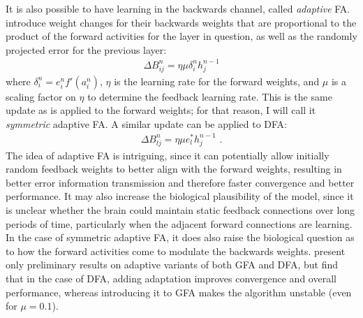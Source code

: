It is also possible to have learning in the backwards channel,
called \emph{adaptive} FA.
\textcite{Baldi2016} introduce weight changes for their backwards weights
that are proportional to the product of the forward activities
for the layer in question,
as well as the randomly projected error for the previous layer:
\begin{align}
  \Delta B^n_{ij} = \eta\mu \delta^n_i h^{n-1}_j
\end{align}
where $\delta^n_i = e^n_i f'(a^n_i)$,
$\eta$ is the learning rate for the forward weights,
and $\mu$ is a scaling factor on $\eta$ to determine the feedback learning rate.
This is the same update as is applied to the forward weights;
for that reason, I will call it \emph{symmetric} adaptive FA.
A similar update can be applied to DFA:
\begin{align}
  \Delta B^n_{lj} = \eta\mu e^*_l h^{n-1}_j \text{ .}
\end{align}
The idea of adaptive FA is intriguing,
since it can potentially allow initially random feedback weights
to better align with the forward weights,
resulting in better error information transmission
and therefore faster convergence and better performance.
It may also increase the biological plausibility of the model,
since it is unclear whether the brain could maintain static feedback connections
over long periods of time,
particularly when the adjacent forward connections are learning.
In the case of symmetric adaptive FA,
it does also raise the biological question
as to how the forward activities come to modulate the backwards weights.
\textcite{Baldi2016} present only preliminary results on adaptive variants
of both GFA and DFA,
but find that in the case of DFA,
adding adaptation improves convergence and overall performance,
whereas introducing it to GFA makes the algorithm unstable
(even for $\mu = 0.1$).

